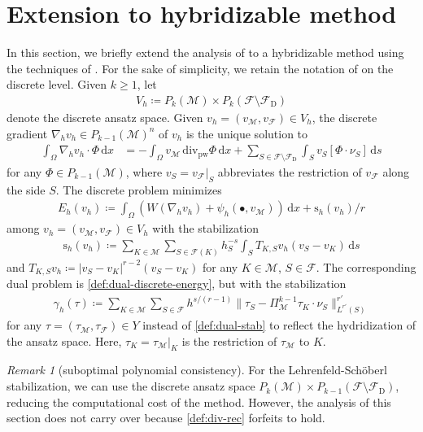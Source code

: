 \documentclass[a4paper]{amsart}
\numberwithin{equation}{section}
\renewcommand{\d}[1]{\,\mathrm{d}#1}
\renewcommand{\div}{\mathrm{div}}
\newcommand{\Mcal}{\mathcal{M}}
\newcommand{\pw}{\mathrm{pw}}
\newcommand{\s}{\mathrm{s}}
\theoremstyle{remark}
\newtheorem{remark}[theorem]{Remark}
\begin{document}
\section{Extension to hybridizable method}\label{sec:hybrid}
In this section, we briefly extend the analysis of  to a hybridizable method using the techniques of \cite{Tran2024}. For the sake of simplicity, we retain the notation of  on the discrete level.
Given $k \geq 1$, let
\begin{align*}
	V_h \coloneqq P_k(\Mcal) \times P_k(\mathcal{F}\setminus\mathcal{F}_\mathrm{D})
\end{align*}
denote the discrete ansatz space. Given $v_h = (v_\Mcal,v_\mathcal{F}) \in V_h$, the discrete gradient $\nabla_h v_h \in P_{k-1}(\Mcal)^n$ of $v_h$ is the unique solution to
\begin{align*}
	\int_\Omega \nabla_h v_h \cdot \Phi \d{x} &= -\int_\Omega v_\Mcal \,\div_\pw \Phi \d{x} + \sum_{S \in \mathcal{F}\setminus\mathcal{F}_\mathrm{D}} \int_S v_S [\Phi \cdot \nu_S] \d{s}
\end{align*}
for any $\Phi \in P_{k-1}(\Mcal)$,
where $v_S = v_\mathcal{F}|_S$ abbreviates the restriction of $v_\mathcal{F}$ along the side $S$. The discrete problem minimizes
\begin{align}
	E_h(v_h) \coloneqq \int_\Omega (W(\nabla_h v_h) + \psi_h(\bullet,v_\Mcal)) \d{x} + \s_h(v_h)/r
\end{align}
among $v_h = (v_\Mcal, v_\mathcal{F}) \in V_h$
with the stabilization
\begin{align*}
	\s_h(v_h) \coloneqq \sum_{K \in \Mcal} \sum_{S \in \mathcal{F}(K)} h_S^{-s} \int_S T_{K,S} v_h (v_S - v_K) \d{s}
\end{align*}
and $T_{K,S} v_h \coloneqq |v_S - v_K|^{r-2}(v_S - v_K)$ for any $K \in \Mcal$, $S \in \mathcal{F}$.
The corresponding dual problem is \eqref{def:dual-discrete-energy}, 
but with the stabilization
\begin{align*}
	\gamma_h(\tau) \coloneqq \sum_{K \in \Mcal} \sum_{S \in \mathcal{F}} h^{s/(r-1)}\|\tau_S - \Pi_\Mcal^{k-1}\tau_K \cdot \nu_S\|^{r'}_{L^{r'}(S)}
\end{align*}
for any $\tau = (\tau_\Mcal, \tau_\mathcal{F}) \in Y$
instead of \eqref{def:dual-stab}
to reflect the hydridization of the ansatz space.
Here, $\tau_K = \tau_\Mcal|_K$ is the restriction of $\tau_\Mcal$ to $K$.
\begin{remark}[suboptimal polynomial consistency]\label{rem:LS-stab}
	For the Lehrenfeld-Sch\"oberl stabilization, we can use the discrete ansatz space $P_k(\Mcal) \times P_{k-1}(\mathcal{F}\setminus\mathcal{F}_\mathrm{D})$, reducing the computational cost of the method. However, the analysis of this section does not carry over because \eqref{def:div-rec} forfeits to hold.
\end{remark}
\end{document}
